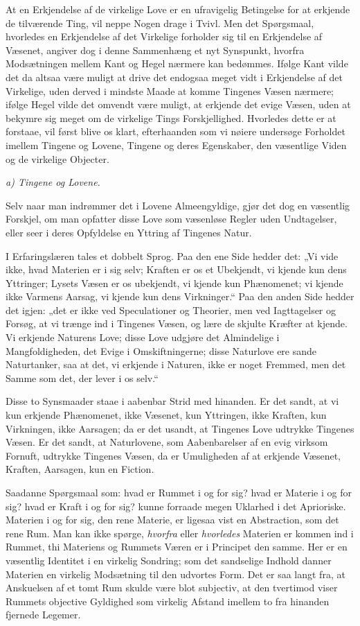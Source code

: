 \documentclass[12pt]{book}
\newcommand{\opage}[1]{\marginnote{\footnotesize\textit{[#1]}}}
\begin{document}
At en Erkjendelse af de virkelige Love er en ufravigelig Betingelse for at erkjende de
tilværende Ting, vil neppe Nogen drage i Tvivl. Men det Spørgsmaal, hvorledes en
Erkjendelse af det Virkelige forholder sig til en Erkjendelse af Væsenet, angiver dog i
denne Sammenhæng et nyt Synspunkt, hvorfra Modsætningen mellem Kant og Hegel nærmere
kan bedømmes. Ifølge Kant vilde det da altsaa være muligt at drive det endogsaa meget
vidt i Erkjendelse af det Virkelige, uden derved i mindste Maade at komme Tingenes
Væsen nærmere; ifølge Hegel vilde det omvendt være muligt, at erkjende det evige
Væsen, uden at bekymre sig meget om de virkelige Tings Forskjellighed. Hvorledes dette
er at forstaae, vil først blive os klart, efterhaanden som vi nøiere undersøge
Forholdet imellem Tingene og Lovene, Tingene og deres Egenskaber, den væsentlige Viden
og de virkelige Objecter.

\emph{a) Tingene og Lovene.}

Selv naar man indrømmer det i Lovene Almeengyldige, gjør det dog en væsentlig Forskjel,
om man opfatter disse Love som væsenløse Regler uden Undtagelser, eller seer i deres
Opfyldelse en Yttring af Tingenes Natur.

\opage{61} I Erfaringslæren tales et dobbelt Sprog. Paa den ene Side hedder det: „Vi vide ikke,
hvad Materien er i sig selv; Kraften er os et Ubekjendt, vi kjende kun dens Yttringer;
Lysets Væsen er os ubekjendt, vi kjende kun Phænomenet; vi kjende ikke Varmens Aarsag,
vi kjende kun dens Virkninger.“ Paa den anden Side hedder det igjen: „det er ikke ved
Speculationer og Theorier, men ved Iagttagelser og Forsøg, at vi trænge ind i Tingenes
Væsen, og lære de skjulte Kræfter at kjende. Vi erkjende Naturens Love; disse Love
udgjøre det Almindelige i Mangfoldigheden, det Evige i Omskiftningerne; disse Naturlove
ere sande Naturtanker, saa at det, vi erkjende i Naturen, ikke er noget Fremmed, men
det Samme som det, der lever i os selv.“

Disse to Synsmaader staae i aabenbar Strid med hinanden. Er det sandt, at vi kun
erkjende Phænomenet, ikke Væsenet, kun Yttringen, ikke Kraften, kun Virkningen, ikke
Aarsagen; da er det usandt, at Tingenes Love udtrykke Tingenes Væsen. Er det sandt, at
Naturlovene, som Aabenbarelser af en evig virksom Fornuft, udtrykke Tingenes Væsen, da
er Umuligheden af at erkjende Væsenet, Kraften, Aarsagen, kun en Fiction.

Saadanne Spørgsmaal som: hvad er Rummet i og for sig? hvad er Materie i og for sig?
hvad er Kraft i og for sig? kunne forraade megen Uklarhed i det Aprioriske. Materien i
og for sig, den rene Materie, er ligesaa vist en Abstraction, som det rene Rum. Man kan
ikke spørge, \emph{hvorfra} eller \emph{hvorledes} Materien er kommen ind i Rummet, thi
Materiens og Rummets Væren er i Principet den samme. Her er en væsentlig Identitet i en
virkelig Sondring; som det sandselige Indhold danner Materien en virkelig Modsætning
til den udvortes Form. Det er saa langt fra, at Anskuelsen af et tomt Rum skulde være
blot subjectiv, at den tvertimod viser Rummets objective Gyldighed som virkelig Afstand
imellem to fra hinanden fjernede Legemer.
\end{document}
